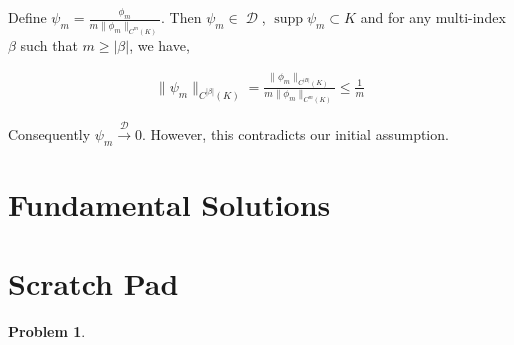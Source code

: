 \documentclass[12pt, a4]{article}
\newtheorem{problem}[theorem]{Problem}
\DeclareMathOperator\supp{supp}
\DeclareMathOperator\tfspaceD{\mathcal{D}}
\begin{document}
Define $\psi_m = \frac{\phi_m}{m \| \phi_m \|_{C^m(K)}}$. Then $\psi_m \in \tfspaceD$, $\supp \psi_m \subset K$ and for any multi-index $\beta$ such that $m \geq |\beta|$, we have,

\begin{eqnarray}
    \| \psi_m \|_{C^{|\beta|}(K)} = \frac{\|\phi_m\|_{C^{|B|}(K)}}{m \|\phi_m\|_{C^m(K)}} \leq \frac{1}{m}
\end{eqnarray}

Consequently $\psi_m \overset{\tfspaceD}{\rightarrow} 0$. However, this contradicts our initial assumption.

\section{Fundamental Solutions}




\section{Scratch Pad}

\begin{problem}

\end{problem}
\end{document}
